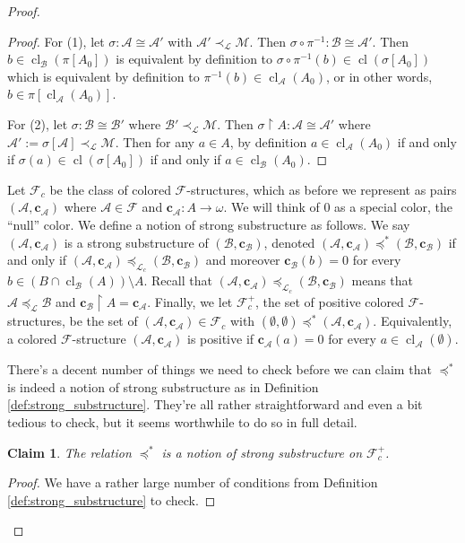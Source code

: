 \documentclass[12pt]{amsart}
\theoremstyle{plain}
\newtheorem{claim}{Claim}
\theoremstyle{definition}
\newcommand{\isom}{\cong}
\newcommand{\mcA}{\mathcal{A}}
\newcommand{\mcB}{\mathcal{B}}
\newcommand{\mcF}{\mathcal{F}}
\newcommand{\mcL}{\mathcal{L}}
\newcommand{\mcM}{\mathcal{M}}
\newcommand{\oc}{\mathbf{c}}
\DeclareMathOperator{\cl}{cl}
\begin{document}
\begin{proof}
\begin{proof}
For (1), let $\sigma : \mcA \isom \mcA'$ with $\mcA' \prec_\mcL \mcM$.
Then $\sigma \circ \pi^{-1} : \mcB \isom \mcA'$.
Then $b \in \cl_\mcB(\pi[A_0])$ is equivalent by definition to $\sigma \circ \pi^{-1}(b) \in \cl(\sigma[A_0])$ which is equivalent by definition to $\pi^{-1}(b) \in \cl_\mcA(A_0)$, or in other words, $b \in \pi[\cl_\mcA(A_0)]$.

For (2), let $\sigma : \mcB \isom \mcB'$ where $\mcB' \prec_\mcL \mcM$.
Then $\sigma \upharpoonright A : \mcA \isom \mcA'$ where $\mcA' := \sigma[\mcA] \prec_\mcL \mcM$.
Then for any $a \in A$, by definition $a \in \cl_\mcA(A_0)$ if and only if $\sigma(a) \in \cl(\sigma[A_0])$ if and only if $a \in \cl_\mcB(A_0)$.
\end{proof}


Let $\mcF_c$ be the class of colored $\mcF$-structures, which as before we represent as pairs $(\mcA, \oc_\mcA)$ where $\mcA \in \mcF$ and $\oc_\mcA : A \rightarrow \omega$.
We will think of 0 as a special color, the ``null'' color.
We define a notion of strong substructure as follows.
We say $(\mcA, \oc_\mcA)$ is a strong substructure of $(\mcB, \oc_\mcB)$, denoted $(\mcA, \oc_\mcA) \preceq^* (\mcB, \oc_\mcB)$ if and only if $(\mcA, \oc_\mcA) \preceq_{\mcL_c} (\mcB, \oc_\mcB)$ and moreover $\oc_\mcB(b) = 0$ for every $b \in (B \cap \cl_\mcB(A)) \setminus A$.
Recall that $(\mcA, \oc_\mcA) \preceq_{\mcL_c} (\mcB, \oc_\mcB)$ means that $\mcA \preceq_\mcL \mcB$ and $\oc_\mcB \upharpoonright A = \oc_\mcA$.
Finally, we let $\mcF^+_c$, the set of positive colored $\mcF$-structures, be the set of $(\mcA, \oc_\mcA) \in \mcF_c$ with $(\emptyset, \emptyset) \preceq^* (\mcA, \oc_\mcA)$.
Equivalently, a colored $\mcF$-structure $(\mcA, \oc_\mcA)$ is positive if $\oc_\mcA(a) = 0$ for every $a \in \cl_\mcA(\emptyset)$.

There's a decent number of things we need to check before we can claim that $\preceq^*$ is indeed a notion of strong substructure as in Definition \ref{def:strong_substructure}.
They're all rather straightforward and even a bit tedious to check, but it seems worthwhile to do so in full detail.

\begin{claim}
The relation $\preceq^*$ is a notion of strong substructure on $\mcF_c^+$.
\end{claim}

\begin{proof}
We have a rather large number of conditions from Definition \ref{def:strong_substructure} to check.


\end{proof}
\end{proof}
\end{document}
